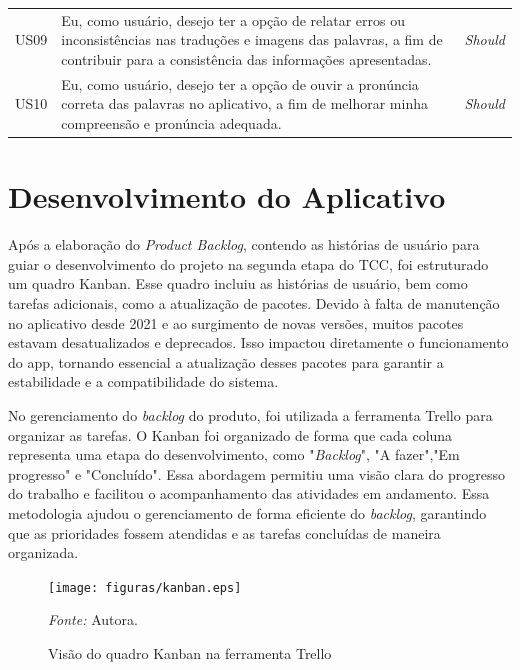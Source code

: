 \begin{table}[h!]
\begin{tabularx}{\textwidth}{p{1cm}|p{12cm}|p{1cm}}
	US09 & Eu, como usuário, desejo ter a opção de relatar erros ou inconsistências nas traduções e imagens das palavras, a fim de contribuir para a consistência das informações apresentadas.                                  & \textit{Should}      \\
	US10 & Eu, como usuário, desejo ter a opção de ouvir a pronúncia correta das palavras no aplicativo, a fim de melhorar minha compreensão e pronúncia adequada.                                                               & \textit{Should}      \\ \hline
	\end{tabularx}
\end{table}

\section{Desenvolvimento do Aplicativo}
\label{sec:Desenvolvimento do Aplicativo}
Após a elaboração do \textit{Product Backlog}, contendo as histórias de usuário para guiar o desenvolvimento do projeto na segunda etapa do TCC, foi estruturado um quadro Kanban. Esse quadro incluiu as histórias de usuário, 
bem como tarefas adicionais, como a atualização de pacotes. Devido à falta de manutenção no aplicativo desde 2021 e ao surgimento de novas versões, muitos pacotes estavam desatualizados e deprecados. Isso impactou diretamente 
o funcionamento do app, tornando essencial a atualização desses pacotes para garantir a estabilidade e a compatibilidade do sistema.

No gerenciamento do \textit{backlog} do produto, foi utilizada a ferramenta Trello para organizar as tarefas. O Kanban foi organizado de forma que cada coluna representa uma etapa do desenvolvimento, como "\textit{Backlog}", 
"A fazer","Em progresso" e "Concluído". Essa abordagem permitiu uma visão clara do progresso do trabalho e facilitou o acompanhamento das atividades em andamento. Essa metodologia ajudou o gerenciamento de forma eficiente do 
\textit{backlog}, garantindo que as prioridades fossem atendidas e as tarefas concluídas de maneira organizada.

\begin{figure}[h!]
	\centering
	\caption{Visão do quadro Kanban na ferramenta Trello}
	\begin{adjustbox}{center}
		\texttt{[image: figuras/kanban.eps]}
	\end{adjustbox}
	\begin{tablenotes}[flushleft]
		\centering
		\item \textit{Fonte:} Autora.
	\end{tablenotes}
	\label{fig33}
\end{figure}

